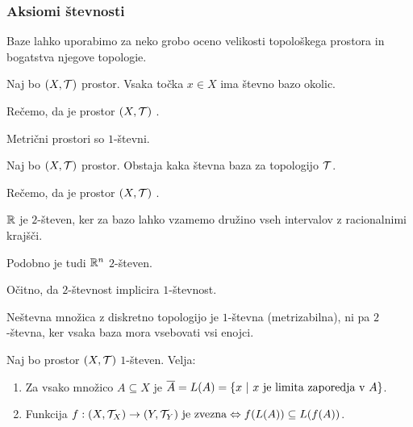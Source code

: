 \subsubsection{Aksiomi števnosti}

Baze lahko uporabimo za neko grobo oceno velikosti topološkega prostora in bogatstva njegove topologie.

\begin{definicija}
    Naj bo $(X, \mathcal{T})$ prostor. Vsaka točka $x \in X$ ima števno bazo okolic.

    Rečemo, da je prostor $(X, \mathcal{T})$ . 
\end{definicija}

\begin{primer}
    Metrični prostori so $1$-števni.
\end{primer}

\begin{definicija}
    Naj bo $(X, \mathcal{T})$ prostor. Obstaja kaka števna baza za topologijo $\mathcal{T}$.

    Rečemo, da je prostor $(X, \mathcal{T})$ . 
\end{definicija}

\begin{primer}
    $\mathbb{R}$ je $2$-števen, ker za bazo lahko vzamemo družino vseh intervalov z racionalnimi krajšči. 
    
    Podobno je tudi $\mathbb{R}^n$ $2$-števen.
\end{primer}

\begin{opomba}
    Očitno, da $2$-števnost implicira $1$-števnost.
\end{opomba}

\begin{primer}
    Neštevna množica z diskretno topologijo je $1$-števna (metrizabilna), ni pa $2$-števna, ker vsaka baza mora vsebovati vsi enojci.
\end{primer}

\begin{trditev}
    Naj bo prostor $(X, \mathcal{T})$ $1$-števen. Velja:
    \begin{enumerate}
        \item Za vsako množico $A \subseteq X$ je $\overline{A} = L(A) = \left\{x \ | \ x \text{ je limita zaporedja v } A\right\}$.
        \item Funkcija $f: (X, \mathcal{T}_X) \to (Y, \mathcal{T}_Y) \text{ je zvezna} \Leftrightarrow f(L(A)) \subseteq L(f(A))$.
    \end{enumerate}
\end{trditev}

